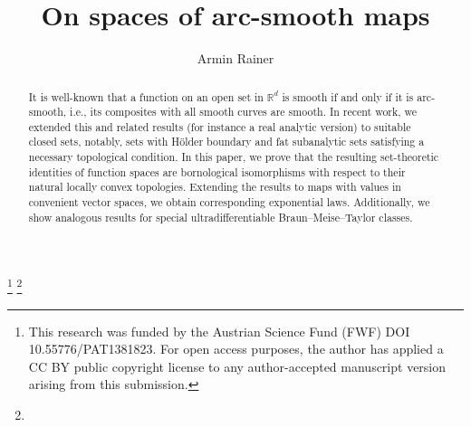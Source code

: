 \documentclass[10pt, reqno]{amsart}
\title{On spaces of arc-smooth maps}
\author[Armin Rainer]{Armin Rainer \orcidlink{0000-0003-3825-3313}}
\theoremstyle{plain}
\theoremstyle{definition}
\numberwithin{equation}{section}
\def\R{\mathbb{R}}
\begin{document}
\begin{abstract}
    It is well-known that a function on an open set in $\R^d$ is smooth if and only if 
    it is arc-smooth, i.e., its composites with all smooth curves are smooth. 
    In recent work, we extended this and related results (for instance a real analytic version) 
    to suitable closed sets, notably, 
    sets with H\"older boundary and fat subanalytic sets satisfying a necessary topological 
    condition. 
    In this paper, we prove that the resulting set-theoretic identities of function spaces 
    are bornological isomorphisms with respect to their natural locally convex topologies.
    Extending the results to maps with values in convenient vector spaces, 
    we obtain corresponding exponential laws. 
    Additionally, we show analogous results for special ultradifferentiable 
    Braun--Meise--Taylor classes.
\end{abstract}


\thanks{This research was funded %
    by the Austrian Science Fund (FWF) DOI 10.55776/PAT1381823.
    For open access purposes, the author has applied a CC BY public copyright license 
    to any author-accepted manuscript version arising from this submission.}
\thanks{}
\end{document}

